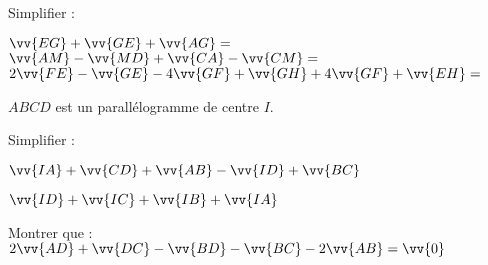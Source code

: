 \documentclass[a4paper,addpoints,12pt]{exam}
\begin{document}
\begin{exo}[3]
\begin{questions}
\question[3] Simplifier :

\(\vv{EG}+\vv{GE}+\vv{AG}= \)\anserline[2]
\(\vv{AM}-\vv{MD}+\vv{CA}-\vv{CM}= \)\anserline[2]
\(2\vv{FE}-\vv{GE}-4\vv{GF}+\vv{GH}+4\vv{GF}+\vv{EH}= \)\anserline[2]
\end{questions}
\end{exo}

\begin{exo}[3]
$ABCD$ est un parallélogramme de centre $I$.
\begin{questions}
\question[2] Simplifier :
\begin{multicols}{2}
$\vv{IA}+\vv{CD}+\vv{AB}-\vv{ID}+\vv{BC}$

\anserline[5]
\columnbreak

$\vv{ID}+\vv{IC}+\vv{IB}+\vv{IA}$

\anserline[5]
\end{multicols}
\question[1] Montrer que : $2\vv{AD}+\vv{DC}-\vv{BD}-\vv{BC}-2\vv{AB}=\vv{0}$

\anserline[10]
\end{questions}
\end{exo}
\end{document}
